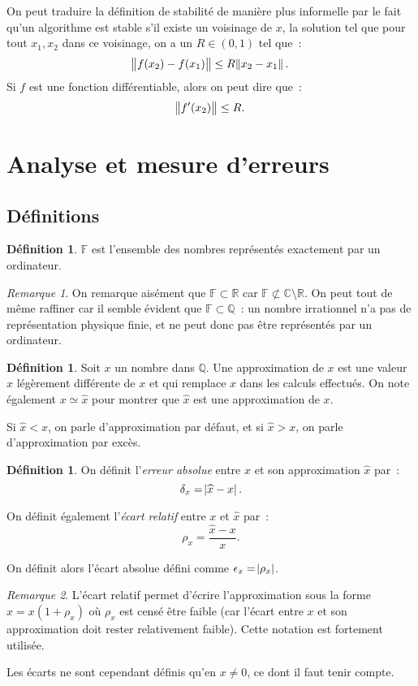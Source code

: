 \documentclass{article}
\theoremstyle{definition}
\newtheorem{déf}[thm]{Définition}
\theoremstyle{remark}
\newtheorem*{rmq}{Remarque}
\newcommand{\C}{\mathbb C}
\newcommand{\F}{\mathbb F}
\newcommand{\Q}{\mathbb Q}
\newcommand{\R}{\mathbb R}
\begin{document}
	On peut traduire la définition de stabilité de manière plus informelle par le fait qu'un algorithme est stable s'il existe un voisinage de $x$, la solution
	tel que pour tout $x_1, x_2$ dans ce voisinage, on a un $R \in (0, 1)$ tel que~:
	\[\norm {f(x_2)-f(x_1)} \leq R\norm {x_2-x_1}.\]
	Si $f$ est une fonction différentiable, alors on peut dire que~:
	\[\norm {f'(x_2)} \leq R.\]

\newpage
\section{Analyse et mesure d'erreurs}
	\subsection{Définitions}
		\begin{déf} $\F$ est l'ensemble des nombres représentés exactement par un ordinateur. \end{déf}

		\begin{rmq} On remarque aisément que $\F \subset \R$ car $\F \not \subset \C \setminus \R$. On peut tout de même raffiner car il semble évident que
		$\F \subset \Q$~: un nombre irrationnel n'a pas de représentation physique finie, et ne peut donc pas être représentés par un ordinateur.
		\end{rmq}

		\begin{déf} Soit $x$ un nombre dans $\Q$. Une approximation de $x$ est une valeur $\widehat x$ légèrement différente de $x$ et qui remplace $x$ dans les
		calculs effectués. On note également $x \simeq \widehat x$ pour montrer que $\widehat x$ est une approximation de $x$.

		Si $\widehat x < x$, on parle d'approximation par défaut, et si $\widehat x > x$, on parle d'approximation par excès.
		\end{déf}

		\begin{déf} On définit l'\emph{erreur absolue} entre $x$ et son approximation $\widehat x$ par~:
		\[\delta_x = \abs {\widehat x - x}.\]

		On définit également l'\emph{écart relatif} entre $x$ et $\widehat x$ par~:
		\[\rho_x = \frac {\widehat x - x}x.\]

		On définit alors l'écart absolue défini comme $\epsilon_x = \abs {\rho_x}$.
		\end{déf}

		\begin{rmq} L'écart relatif permet d'écrire l'approximation sous la forme $\widehat x = x(1+\rho_x)$ où $\rho_x$ est censé être faible (car l'écart
		entre $x$ et son approximation doit rester relativement faible). Cette notation est fortement utilisée.

		Les écarts ne sont cependant définis qu'en $x \neq 0$, ce dont il faut tenir compte.
		\end{rmq}
\end{document}
